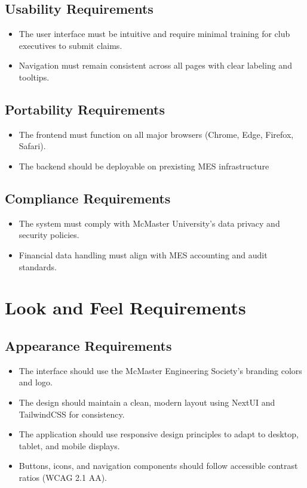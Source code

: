\documentclass[12pt]{article}
\begin{document}
    \subsection{Usability Requirements}
    \begin{itemize}
        \item The user interface must be intuitive and require minimal training for club executives to submit claims.
        \item Navigation must remain consistent across all pages with clear labeling and tooltips.
    \end{itemize}

    \subsection{Portability Requirements}
    \begin{itemize}
        \item The frontend must function on all major browsers (Chrome, Edge, Firefox, Safari).
        \item The backend should be deployable on prexisting MES infrastructure
    \end{itemize}

    \subsection{Compliance Requirements}
    \begin{itemize}
        \item The system must comply with McMaster University’s data privacy and security policies.
        \item Financial data handling must align with MES accounting and audit standards.
    \end{itemize}

\section{Look and Feel Requirements}
    \subsection{Appearance Requirements}
    \begin{itemize}
        \item The interface should use the McMaster Engineering Society’s branding colors and logo.
        \item The design should maintain a clean, modern layout using NextUI and TailwindCSS for consistency.
        \item The application should use responsive design principles to adapt to desktop, tablet, and mobile displays.
        \item Buttons, icons, and navigation components should follow accessible contrast ratios (WCAG 2.1 AA).
    \end{itemize}
\end{document}
